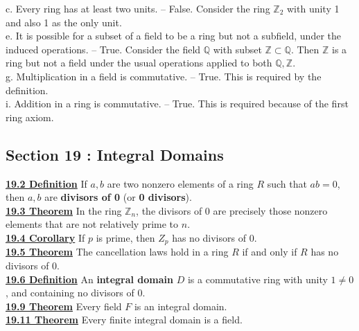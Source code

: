 \documentclass[12pt, letterpaper]{article}
\begin{document}
c. Every ring has at least two units. -- False. Consider the ring $\mathbb{Z}_2$ with unity 1 and also 1 as the only unit. \\

e. It is possible for a subset of a field to be a ring but not a subfield, under the induced operations. -- True. Consider the field $\mathbb{Q}$ with subset $\mathbb{Z} \subset \mathbb{Q}$. Then $\mathbb{Z}$ is a ring but not a field under the usual operations applied to both $\mathbb{Q},\mathbb{Z}$. \\

g. Multiplication in a field is commutative. -- True. This is required by the definition. \\

i. Addition in a ring is commutative. -- True. This is required because of the first ring axiom. \\

\subsection{Section 19 : Integral Domains}

\noindent \underline{\bf 19.2 Definition} If $a,b$ are two nonzero elements of a ring $R$ such that $ab = 0$, then $a,b$ are {\bf divisors of 0} (or {\bf 0 divisors}). \\

\noindent \underline{\bf 19.3 Theorem} In the ring $\mathbb{Z}_n$, the divisors of $0$ are precisely those nonzero elements that are not relatively prime to $n$. \\

\noindent \underline{\bf 19.4 Corollary} If $p$ is prime, then $Z_p$ has no divisors of $0$. \\

\noindent \underline{\bf 19.5 Theorem} The cancellation laws hold in a ring $R$ if and only if $R$ has no divisors of $0$. \\

\noindent \underline{\bf 19.6 Definition} An {\bf integral domain} $D$ is a commutative ring with unity $1 \neq 0$, and containing no divisors of $0$. \\

\noindent \underline{\bf 19.9 Theorem} Every field $F$ is an integral domain. \\

\noindent \underline{\bf 19.11 Theorem} Every finite integral domain is a field. \\
\end{document}
